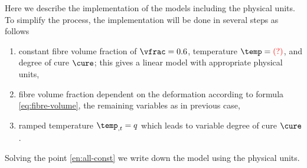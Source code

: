 \documentclass[twoside,a4paper,12pt]{article}
\newcommand{\QM}{{\color{red}(?)}}
\begin{document}
Here we describe the implementation of the models including the
physical units. To simplify the process, the implementation will be
done in several steps as follows
%
\begin{enumerate}
\item constant fibre volume fraction of $\vfrac = 0.6$, temperature $\temp=\QM$, and degree of cure $\cure$; this gives a linear model with appropriate physical units, \label{en:all-const}
\item fibre volume fraction dependent on the deformation according to formula \eqref{eq:fibre-volume}, the remaining variables as in previous case,
\item ramped temperature $\temp_{,t} = q$ which leads to variable degree of cure $\cure$.
\end{enumerate}

Solving the point \ref{en:all-const} we write down the model using the physical units.







\end{document}
